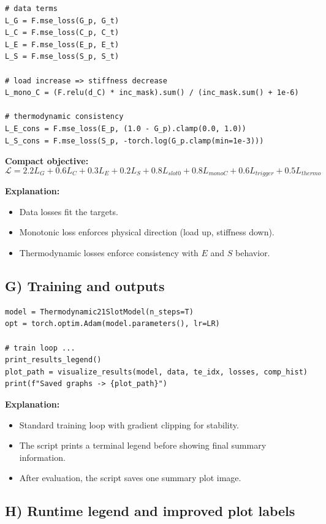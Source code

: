 \documentclass[12pt,a4paper]{article}
\begin{document}
\begin{lstlisting}[caption=Main physics losses]
# data terms
L_G = F.mse_loss(G_p, G_t)
L_C = F.mse_loss(C_p, C_t)
L_E = F.mse_loss(E_p, E_t)
L_S = F.mse_loss(S_p, S_t)

# load increase => stiffness decrease
L_mono_C = (F.relu(d_C) * inc_mask).sum() / (inc_mask.sum() + 1e-6)

# thermodynamic consistency
L_E_cons = F.mse_loss(E_p, (1.0 - G_p).clamp(0.0, 1.0))
L_S_cons = F.mse_loss(S_p, -torch.log(G_p.clamp(min=1e-3)))
\end{lstlisting}

\textbf{Compact objective:}
\[
\mathcal{L}=2.2L_G+0.6L_C+0.3L_E+0.2L_S+0.8L_{slot0}+0.8L_{monoC}+0.6L_{trigger}+0.5L_{thermo}
\]

\textbf{Explanation:}
\begin{itemize}
  \item Data losses fit the targets.
  \item Monotonic loss enforces physical direction (load up, stiffness down).
  \item Thermodynamic losses enforce consistency with $E$ and $S$ behavior.
\end{itemize}

\subsection{G) Training and outputs}

\begin{lstlisting}[caption=Training and graph export]
model = Thermodynamic21SlotModel(n_steps=T)
opt = torch.optim.Adam(model.parameters(), lr=LR)

# train loop ...
print_results_legend()
plot_path = visualize_results(model, data, te_idx, losses, comp_hist)
print(f"Saved graphs -> {plot_path}")
\end{lstlisting}

\textbf{Explanation:}
\begin{itemize}
  \item Standard training loop with gradient clipping for stability.
  \item The script prints a terminal legend before showing final summary information.
  \item After evaluation, the script saves one summary plot image.
\end{itemize}

\subsection{H) Runtime legend and improved plot labels}
\end{document}
